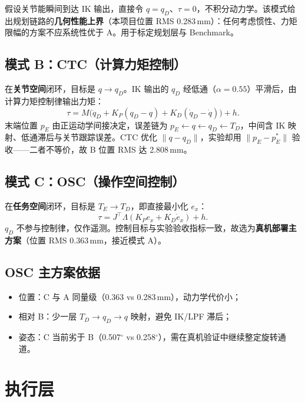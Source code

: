 \documentclass[UTF8, a4paper, 12pt]{ctexart}
\begin{document}
假设关节能瞬间到达 IK 输出，直接令 $q=q_D$、$\tau=0$，不积分动力学。该模式给出规划链路的\textbf{几何性能上界}（本项目位置 RMS 0.283\,mm）：任何考虑惯性、力矩限幅的方案不应系统性优于 A。用于标定规划层与 Benchmark。

\subsection{模式 B：CTC（计算力矩控制）}

在\textbf{关节空间}闭环，目标是 $q\rightarrow q_D$。IK 输出的 $q_D$ 经低通（$\alpha=0.55$）平滑后，由计算力矩控制律输出力矩：
\begin{equation}
    \tau = M\bigl(\ddot{q}_D + K_P(q_D-q) + K_D(\dot{q}_D-\dot{q})\bigr) + h.
\end{equation}
末端位置 $p_E$ 由正运动学间接决定，误差链为 $p_E\leftarrow q\leftarrow q_D\leftarrow T_D$，中间含 IK 映射、低通滞后与关节跟踪误差。CTC 优化 $\|q-q_D\|$，实验却用 $\|p_E-p_E^*\|$ 验收——二者不等价，故 B 位置 RMS 达 2.808\,mm。

\subsection{模式 C：OSC（操作空间控制）}

在\textbf{任务空间}闭环，目标是 $T_E\rightarrow T_D$，即直接最小化 $e_x$：
\begin{equation}
    \tau = J^\top \Lambda (K_P e_x + K_D \dot{e}_x) + h.
\end{equation}
$q_D$ 不参与控制律，仅作遥测。控制目标与实验验收指标一致，故选为\textbf{真机部署主方案}（位置 RMS 0.363\,mm，接近模式 A）。

\subsection{OSC 主方案依据}

\begin{itemize}[leftmargin=2em]
    \item 位置：C 与 A 同量级（0.363 vs 0.283\,mm），动力学代价小；
    \item 相对 B：少一层 $T_D\!\rightarrow\! q_D\!\rightarrow\! q$ 映射，避免 IK/LPF 滞后；
    \item 姿态：C 当前劣于 B（0.507$^\circ$ vs 0.258$^\circ$），需在真机验证中继续整定旋转通道。
\end{itemize}

\section{执行层}
\end{document}
